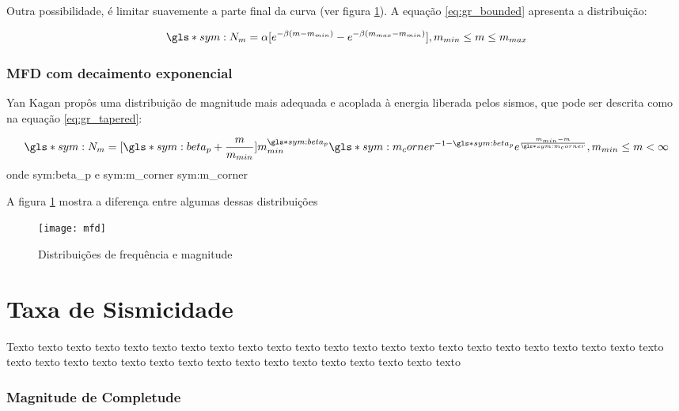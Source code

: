 Outra possibilidade, é limitar suavemente a parte final da curva (ver figura \ref{f:mfd}). A equação \ref{eq:gr_bounded} apresenta
a distribuição:

\begin{equation}
		\gls*{sym:N_m} = \alpha [ e^{-\beta (m - m_{min})} - e^{-\beta (m_{max} - m_{min}) } ], m_{min} \leq m \leq m_{max}
	\label{eq:gr_bounded}
\end{equation}


\subsubsection{MFD com decaimento exponencial}
\label{sec:KMFD}

Yan Kagan \citep{kagan_2002} propôs uma distribuição de magnitude mais adequada e acoplada à energia liberada pelos sismos, que
pode ser descrita como na equação \ref{eq:gr_tapered}:

\begin{equation}\ensuremath{
		\gls*{sym:N_m} = [\gls*{sym:beta_p} + \frac{m}{m_{min}}]
				m_{min}^{\gls*{sym:beta_p}}
				\gls*{sym:m_corner}^{-1 -\gls*{sym:beta_p}}
				e^{\frac{m_{min} - m}{\gls*{sym:m_corner}}}, 
				m_{min} \leq m < \infty
		}
	\label{eq:gr_tapered}
\end{equation}
onde \glsdesc*{sym:beta_p} e \gls*{sym:m_corner} \glsdesc*{sym:m_corner}

A figura \ref{f:mfd} mostra a diferença entre algumas dessas distribuições

\begin{figure}[H]
   \centering
   \texttt{[image: mfd]}
   \caption[Distribuições de frequência e magnitude]
   		   {Distribuições de frequência e magnitude} 
   \label{f:mfd}
\end{figure} 



\section{Taxa de Sismicidade}
\label{sec:risco_sismico}


Texto texto texto texto texto texto texto texto texto texto texto texto texto
texto texto texto texto texto texto texto texto texto texto texto texto texto
texto texto texto texto texto texto texto texto texto texto texto texto texto


\subsubsection{Magnitude de Completude}
\label{sec:risco_sismico}

